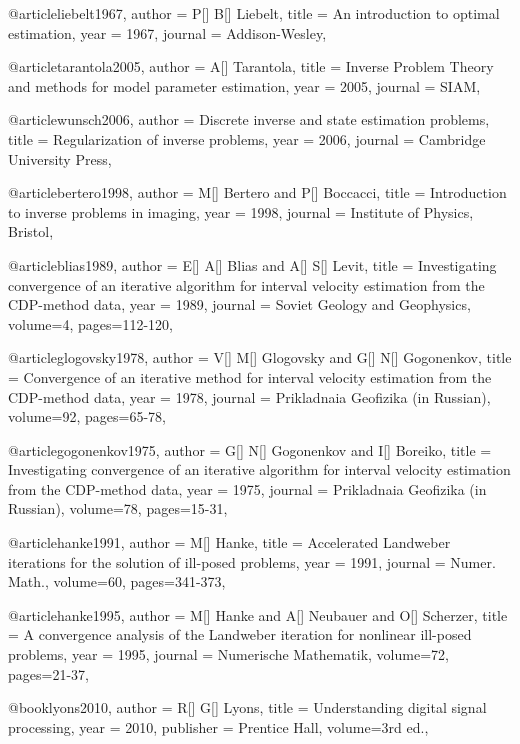 {@article{liebelt1967,
  author =	 {P[] B[] Liebelt},
  title =	 {An introduction to optimal estimation},
  year =	 1967,
  journal =	 {Addison-Wesley},
}

@article{tarantola2005,
  author =	 {A[] Tarantola},
  title =	 {Inverse Problem Theory and methods for model parameter estimation},
  year =	 2005,
  journal =	 {SIAM},
}

@article{wunsch2006,
  author =	 {Discrete inverse and state estimation problems},
  title =	 {Regularization of inverse problems},
  year =	 2006,
  journal =	 {Cambridge University Press},
}


@article{bertero1998,
  author =	 {M[] Bertero and P[] Boccacci},
  title =	 {Introduction to inverse problems in imaging},
  year =	 1998,
  journal =	 {Institute of Physics, Bristol},
}

@article{blias1989,
  author =	 {E[] A[] Blias and A[] S[] Levit},
  title =	 {Investigating convergence of an iterative algorithm for interval velocity estimation from the CDP-method data},
  year =	 1989,
  journal =	 {Soviet Geology and Geophysics},
  volume={4},
 pages=112-120,
}


@article{glogovsky1978,
  author =	 {V[] M[] Glogovsky and G[] N[] Gogonenkov},
  title =	 {Convergence of an iterative method for interval velocity estimation from the CDP-method data},
  year =	 1978,
  journal =	 {Prikladnaia Geofizika (in Russian)},
  volume={92},
 pages=65-78,
}


@article{gogonenkov1975,
  author =	 {G[] N[] Gogonenkov and I[] Boreiko},
  title =	 {Investigating convergence of an iterative algorithm for interval velocity estimation from the CDP-method data},
  year =	 1975,
  journal =	 {Prikladnaia Geofizika (in Russian)},
  volume={78},
 pages=15-31,
}


@article{hanke1991,
  author =	 {M[] Hanke},
  title =	 {Accelerated Landweber iterations for the solution of ill-posed problems},
  year =	 1991,
  journal =	 {Numer. Math.},
  volume={60},
 pages=341-373,
}


@article{hanke1995,
  author =	 {M[] Hanke and A[] Neubauer and O[] Scherzer},
  title =	 {A convergence analysis of the Landweber iteration for nonlinear ill-posed problems},
  year =	 1995,
  journal =	 {Numerische Mathematik},
  volume={72},
 pages=21-37,
}

@book{lyons2010,
  author =	 {R[] G[] Lyons},
  title =	 {Understanding digital signal processing},
  year =	 2010,
  publisher =	 {Prentice Hall},
  volume={3rd ed.},
}

}
